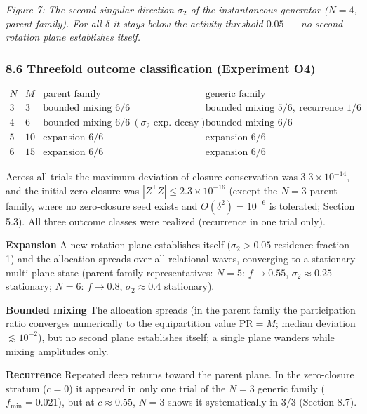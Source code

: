 \documentclass[
  a4paper,
]{article}
\begin{document}
\emph{Figure 7: The second singular direction \(\sigma_2\) of the
instantaneous generator (\(N=4\), parent family). For all \(\delta\) it
stays below the activity threshold \(0.05\) --- no second rotation plane
establishes itself.}

\subsubsection{8.6 Threefold outcome classification (Experiment
O4)}\label{threefold-outcome-classification-experiment-o4}

\[
\begin{array}{cc|cc}
N & M & \text{parent family} & \text{generic family}\\\hline
3 & 3 & \text{bounded mixing }6/6 & \text{bounded mixing }5/6,\ \text{recurrence }1/6\\
4 & 6 & \text{bounded mixing }6/6\ (\sigma_2\text{ exp. decay}) & \text{bounded mixing }6/6\\
5 & 10 & \text{expansion }6/6 & \text{expansion }6/6\\
6 & 15 & \text{expansion }6/6 & \text{expansion }6/6
\end{array}
\]

Across all trials the maximum deviation of closure conservation was
\(3.3\times10^{-14}\), and the initial zero closure was
\(|Z^{\mathsf T}Z|\le2.3\times10^{-16}\) (except the \(N=3\) parent
family, where no zero-closure seed exists and \(O(\delta^2)=10^{-6}\) is
tolerated; Section 5.3). All three outcome classes were realized
(recurrence in one trial only).

\textbf{Expansion} A new rotation plane establishes itself
(\(\sigma_2>0.05\) residence fraction 1) and the allocation spreads over
all relational waves, converging to a stationary multi-plane state
(parent-family representatives: \(N=5\): \(f\to0.55\),
\(\sigma_2\approx0.25\) stationary; \(N=6\): \(f\to0.8\),
\(\sigma_2\approx0.4\) stationary).

\textbf{Bounded mixing} The allocation spreads (in the parent family the
participation ratio converges numerically to the equipartition value
\(\mathrm{PR}=M\); median deviation \(\lesssim10^{-2}\)), but no second
plane establishes itself; a single plane wanders while mixing amplitudes
only.

\textbf{Recurrence} Repeated deep returns toward the parent plane. In
the zero-closure stratum (\(c=0\)) it appeared in only one trial of the
\(N=3\) generic family (\(f_{\min}=0.021\)), but at \(c\approx0.55\),
\(N=3\) shows it systematically in 3/3 (Section 8.7).
\end{document}
